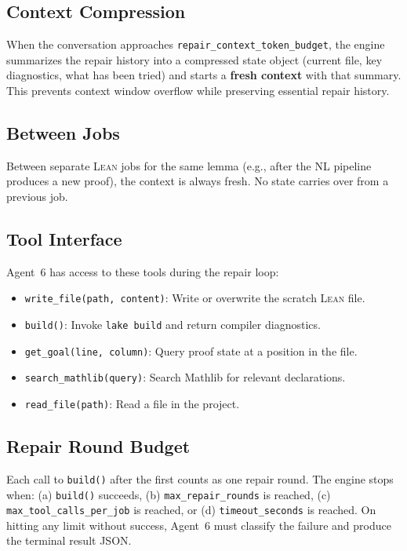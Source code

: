 \documentclass[11pt,a4paper]{article}
\newcommand{\Lean}{\textsc{Lean}}
\begin{document}
\subsection{Context Compression}
When the conversation approaches \texttt{repair\_context\_token\_budget}, the engine summarizes the repair history into a compressed state object (current file, key diagnostics, what has been tried) and starts a \textbf{fresh context} with that summary. This prevents context window overflow while preserving essential repair history.

\subsection{Between Jobs}
Between separate \Lean{} jobs for the same lemma (e.g., after the NL pipeline produces a new proof), the context is always fresh. No state carries over from a previous job.

\subsection{Tool Interface}

Agent~6 has access to these tools during the repair loop:

\begin{itemize}[leftmargin=2em]
  \item \texttt{write\_file(path, content)}: Write or overwrite the scratch \Lean{} file.
  \item \texttt{build()}: Invoke \texttt{lake build} and return compiler diagnostics.
  \item \texttt{get\_goal(line, column)}: Query proof state at a position in the file.
  \item \texttt{search\_mathlib(query)}: Search Mathlib for relevant declarations.
  \item \texttt{read\_file(path)}: Read a file in the project.
\end{itemize}

\subsection{Repair Round Budget}

Each call to \texttt{build()} after the first counts as one repair round. The engine stops when: (a) \texttt{build()} succeeds, (b) \texttt{max\_repair\_rounds} is reached, (c) \texttt{max\_tool\_calls\_per\_job} is reached, or (d) \texttt{timeout\_seconds} is reached. On hitting any limit without success, Agent~6 must classify the failure and produce the terminal result JSON.
\end{document}
